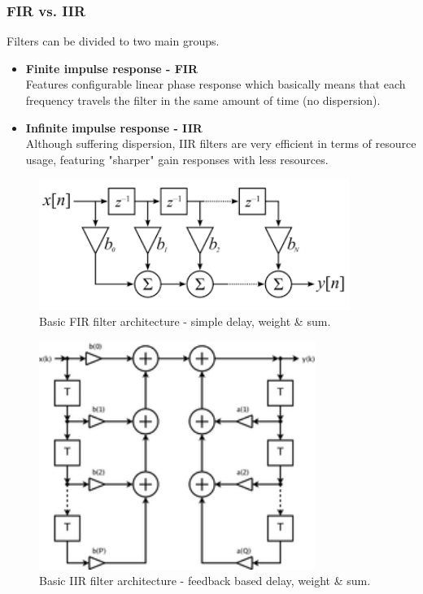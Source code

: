 \documentclass[10pt,pdflatex,headrule,landscape]{beamer}
\begin{document}
\begin{frame}
\frametitle{FIR vs. IIR}
\begin{minipage}{0.65\textwidth}
Filters can be divided to two main groups. 
\begin{itemize}
\item{
\textbf{Finite impulse response - FIR}
\\
Features configurable linear phase response which basically means that each frequency travels the filter in the same amount of time (no dispersion).
}
\item{
\textbf{Infinite impulse response - IIR}
\\
Although suffering dispersion, IIR filters are very efficient in terms of resource usage, featuring "sharper" gain responses with less resources.
}
\end{itemize}
\end{minipage}
\begin{minipage}{0.34\textwidth}
\begin{figure}
\includegraphics[width=0.9\textwidth]{Media/BASIC_FIR_FILTER_ARCH.png}
\caption{Basic FIR filter architecture - simple delay, weight \& sum.}
\end{figure}
\begin{figure}
\includegraphics[width=0.8\textwidth]{Media/BASIC_IIR_FILTER_ARCH.png}
\caption{Basic IIR filter architecture - feedback based delay, weight \& sum.}
\end{figure}
\end{minipage}
\end{frame}
\end{document}
